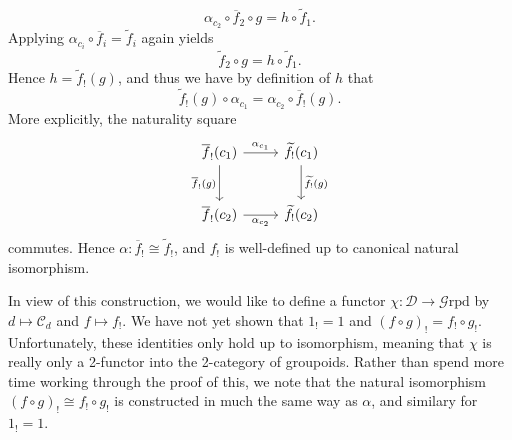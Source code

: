 \[
	\alpha _{c_2} \circ \overline{f} _2 \circ g = h \circ \widetilde{f} _1
.\]
Applying $\alpha _{c_i} \circ \overline{f} _i=\widetilde{f} _i$ again yields
\[
	\widetilde{f} _2 \circ g = h \circ \widetilde{f} _1
.\]
Hence $h=\widetilde{f} _!(g)$, and thus we have by definition of $h$ that
\[
	\widetilde{f} _!(g) \circ \alpha _{c_1}  = \alpha_{c_2} \circ \overline{f} _!(g)
.\]
More explicitly, the naturality square
\[\begin{tikzcd}[row sep = 2.5em, column sep = 2.5em]
\overline{f} _!(c_1)\ar[" \alpha_{c_1}  ", r] \ar[" \overline{f}_!(g) "', d]  & \widetilde{f}_!(c_1)\ar[" \widetilde{f} _!(g) ", d]  \\
\overline{f}_!(c_2)\ar[" \alpha _{c_2}  "', r]  & \widetilde{f}_!(c_2)
\end{tikzcd}\]
commutes. Hence $\alpha : \overline{f} _! \cong \widetilde{f} _!$, and $f_!$ is well-defined up to canonical natural isomorphism.

In view of this construction, we would like to define a functor $\chi : \mathcal{D}  \to \mathcal{G} \mathrm{rpd} $ by $d\mapsto \mathcal{C} _d$ and $f\mapsto f_!$. We have not yet shown that $1_! = 1$ and $(f\circ g)_! = f_! \circ g_!$. Unfortunately, these identities only hold up to isomorphism, meaning that $\chi $ is really only a 2-functor into the 2-category of groupoids. Rather than spend more time working through the proof of this, we note that the natural isomorphism $(f\circ g)_!\cong f_!\circ g_!$ is constructed in much the same way as $\alpha $, and similary for $1_! = 1$.

